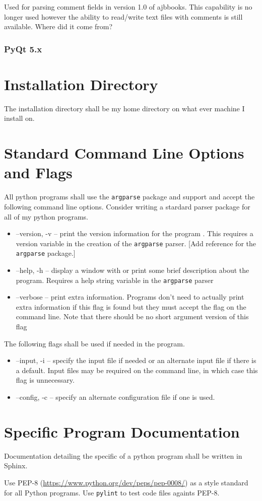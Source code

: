 Used for parsing comment fields in version 1.0 of ajbbooks. This
capability is no longer used however the ability to read/write
text files with comments is still available. Where did it come from?

\subsubsection{PyQt 5.x}

\section{Installation Directory}

The installation directory shall be my home directory on what ever machine
I install on.

\section{Standard Command Line Options and Flags}

All python programs shall use the \texttt{argparse} package and
support and accept the following command line options. Consider
writing a stardard parser package for all of my python programs.

\begin{itemize}

  \item --version, -v -- print the version information for the program .
   This requires a version variable in the creation of the
   \texttt{argparse} parser.  [Add reference for the \texttt{argparse}
   package.]

  \item --help, -h -- display a window with or print some brief
    description about the program. Requires a help string variable in the 
    \texttt{argparse} parser 

  \item --verbose -- print extra information. Programs don't
    need to actually print extra information if this flag is found but
    they must accept the flag on the command line. Note that 
    there should be no short argument version of this flag
\end{itemize}

The following flags shall be used if needed in the program.

\begin{itemize}
  \item --input, -i -- specify the input file if needed or an alternate
   input file if there is a default. Input files may be required on the
   command line, in which case this flag is unnecessary.

 \item --config, -c -- specify an alternate configuration file if one
   is used.
\end{itemize}


\section{Specific Program Documentation}

Documentation detailing the specific of a python program shall be
written in Sphinx.

Use PEP-8  (\url{https://www.python.org/dev/peps/pep-0008/}) as a
style standard for all Python programs. Use \texttt{pylint} to test
code files againts PEP-8. 


